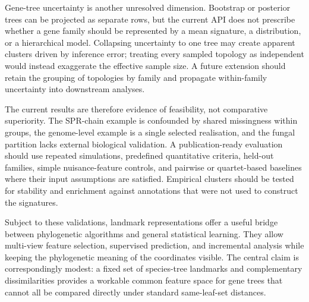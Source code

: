 Gene-tree uncertainty is another unresolved dimension. Bootstrap or posterior trees can be projected as separate rows,
but the current API does not prescribe whether a gene family should be represented by a mean signature, a distribution,
or a hierarchical model. Collapsing uncertainty to one tree may create apparent clusters driven by inference error;
treating every sampled topology as independent would instead exaggerate the effective sample size. A future extension
should retain the grouping of topologies by family and propagate within-family uncertainty into downstream analyses.

The current results are therefore evidence of feasibility, not comparative superiority. The SPR-chain example is
confounded by shared missingness within groups, the genome-level example is a single selected realisation, and the fungal
partition lacks external biological validation. A publication-ready evaluation should use repeated simulations,
predefined quantitative criteria, held-out families, simple nuisance-feature controls, and pairwise or quartet-based
baselines where their input assumptions are satisfied. Empirical clusters should be tested for stability and enrichment
against annotations that were not used to construct the signatures.

Subject to these validations, landmark representations offer a useful bridge between phylogenetic algorithms and
general statistical learning. They allow multi-view feature selection, supervised prediction, and incremental analysis
while keeping the phylogenetic meaning of the coordinates visible. The central claim is correspondingly modest: a fixed
set of species-tree landmarks and complementary dissimilarities provides a workable common feature space for gene trees
that cannot all be compared directly under standard same-leaf-set distances.


